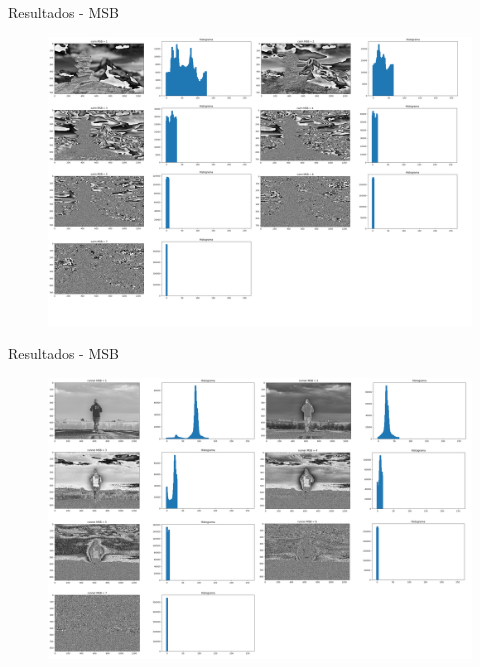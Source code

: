 \documentclass[]{beamer}
\begin{document}
\begin{frame}{Resultados - MSB}
    \begin{figure}
        \includegraphics[scale=0.16]{Imagens/resultados-cairn-msb.png}
    \end{figure}  
\end{frame}

\begin{frame}{Resultados - MSB}
    \begin{figure}
        \includegraphics[scale=0.16]{Imagens/resultados-runner-msb.png}
    \end{figure}  
\end{frame}
\end{document}
